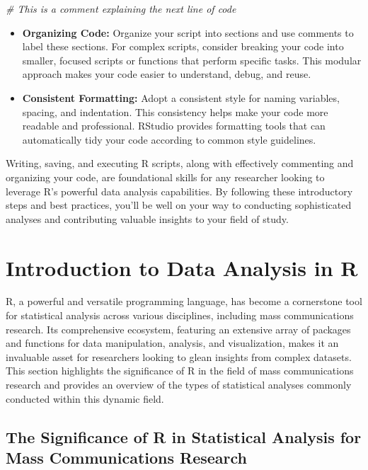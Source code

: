 \documentclass[
]{book}
\newenvironment{Shaded}{\begin{snugshade}}{\end{snugshade}}
\newcommand{\CommentTok}[1]{\textcolor[rgb]{0.56,0.35,0.01}{\textit{#1}}}
\begin{document}
\begin{Shaded}
\begin{Highlighting}[]
\CommentTok{\# This is a comment explaining the next line of code}
\end{Highlighting}
\end{Shaded}

\begin{itemize}
\item
  \textbf{Organizing Code:} Organize your script into sections and use comments to label these sections. For complex scripts, consider breaking your code into smaller, focused scripts or functions that perform specific tasks. This modular approach makes your code easier to understand, debug, and reuse.
\item
  \textbf{Consistent Formatting:} Adopt a consistent style for naming variables, spacing, and indentation. This consistency helps make your code more readable and professional. RStudio provides formatting tools that can automatically tidy your code according to common style guidelines.
\end{itemize}

Writing, saving, and executing R scripts, along with effectively commenting and organizing your code, are foundational skills for any researcher looking to leverage R's powerful data analysis capabilities. By following these introductory steps and best practices, you'll be well on your way to conducting sophisticated analyses and contributing valuable insights to your field of study.

\section{Introduction to Data Analysis in R}\label{introduction-to-data-analysis-in-r}

R, a powerful and versatile programming language, has become a cornerstone tool for statistical analysis across various disciplines, including mass communications research. Its comprehensive ecosystem, featuring an extensive array of packages and functions for data manipulation, analysis, and visualization, makes it an invaluable asset for researchers looking to glean insights from complex datasets. This section highlights the significance of R in the field of mass communications research and provides an overview of the types of statistical analyses commonly conducted within this dynamic field.

\subsection*{The Significance of R in Statistical Analysis for Mass Communications Research}\label{the-significance-of-r-in-statistical-analysis-for-mass-communications-research}
\end{document}

